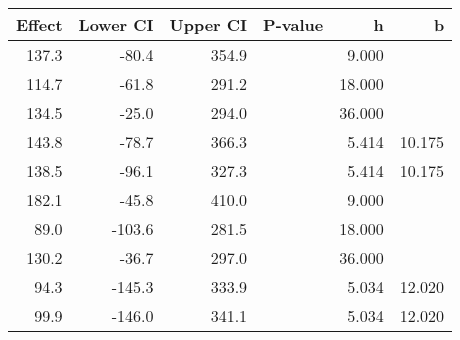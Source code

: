 \begin{table}[ht]
\centering
\begin{tabular}{rrrrrr}
  \hline
Effect & Lower CI & Upper CI & P-value & h & b \\ 
  \hline
137.3 & -80.4 & 354.9 &  & 9.000 &  \\ 
  114.7 & -61.8 & 291.2 &  & 18.000 &  \\ 
  134.5 & -25.0 & 294.0 &  & 36.000 &  \\ 
  143.8 & -78.7 & 366.3 &  & 5.414 & 10.175 \\ 
  138.5 & -96.1 & 327.3 &  & 5.414 & 10.175 \\ 
  182.1 & -45.8 & 410.0 &  & 9.000 &  \\ 
  89.0 & -103.6 & 281.5 &  & 18.000 &  \\ 
  130.2 & -36.7 & 297.0 &  & 36.000 &  \\ 
  94.3 & -145.3 & 333.9 &  & 5.034 & 12.020 \\ 
  99.9 & -146.0 & 341.1 &  & 5.034 & 12.020 \\ 
   \hline
\end{tabular}
\end{table}

